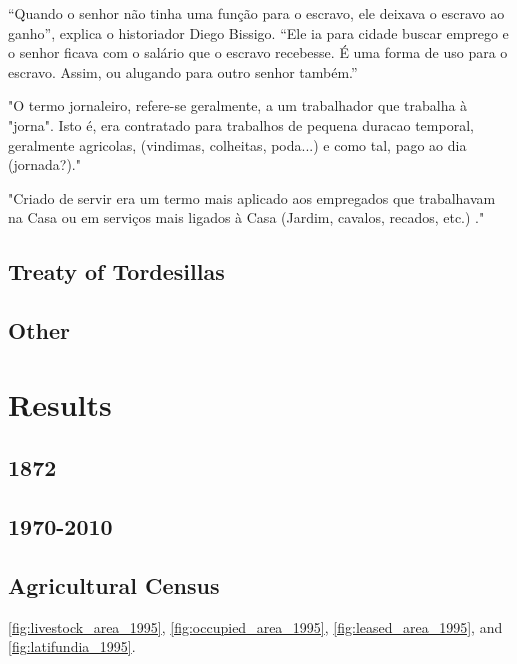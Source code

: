 \documentclass{article}
\begin{document}
“Quando o senhor não tinha uma função para o escravo, ele deixava o escravo ao ganho”, explica o historiador Diego Bissigo. “Ele ia para cidade buscar emprego e o senhor ficava com o salário que o escravo recebesse. É uma forma de uso para o escravo. Assim, ou alugando para outro senhor também.”

"O termo jornaleiro, refere-se geralmente, a um trabalhador que trabalha à "jorna". Isto é, era contratado para trabalhos de pequena duracao temporal, geralmente agricolas, (vindimas, colheitas, poda...) e como tal, pago ao dia (jornada?)."

"Criado de servir era um termo mais aplicado aos empregados que trabalhavam na Casa ou em serviços mais ligados à Casa (Jardim, cavalos, recados, etc.) ."



\parencite[p.~142]{De_Oliveira_Andrade1980-xz}

\subsection{Treaty of Tordesillas}



\subsection{Other}

\section{Results}


\subsection{1872}

\subsection{1970-2010}

\subsection{Agricultural Census}

\autoref{fig:livestock_area_1995}, \autoref{fig:occupied_area_1995}, \autoref{fig:leased_area_1995}, and \autoref{fig:latifundia_1995}.

\clearpage


\end{document}
